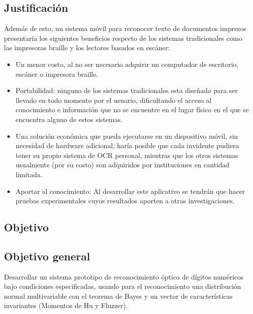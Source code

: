 \documentclass[a4paper, 11pt, oneside]{article}
\begin{document}
	\clearpage

	\begin{center}
	\section{Justificación}
	\end{center}
	
	Además de esto, un sistema móvil para reconocer texto de documentos impresos presentaría los siguientes beneficios respecto de los sistemas tradicionales como las impresoras braille y los lectores basados en escáner:

	\begin{itemize} 

	\item Un menor costo, al no ser necesario adquirir un computador de escritorio, escáner o impresora braille.

	\item Portabilidad: ninguno de los sistemas tradicionales esta diseñado para ser llevado en todo momento por el usuario, dificultando el acceso al conocimiento e información que no se encuentre en el lugar físico en el que se encuentra alguno de estos sistemas.
	
	\item Una solución económica que pueda ejecutarse en un dispositivo móvil, sin necesidad de hardware adicional, haría posible que cada invidente pudiera tener su propio sistema de OCR personal, mientras que los otros sistemas usualmente (por su costo) son adquiridos por instituciones en cantidad limitada.

	\item Aportar al conocimiento: Al desarrollar este aplicativo se tendrán que hacer pruebas experimentales cuyos resultados aporten a otras investigaciones.
	\end{itemize}
	\clearpage

	\begin{center}
	\section{Objetivo}
	\end{center}
	
	\subsection{Objetivo general}
	Desarrollar un sistema prototipo de reconocimiento óptico de dígitos numéricos bajo condiciones especificadas, 
	usando para el reconocimiento una distribución normal multivariable con el teorema de Bayes
	y un vector de características invariantes (Momentos de Hu y Fluzzer).
\end{document}
